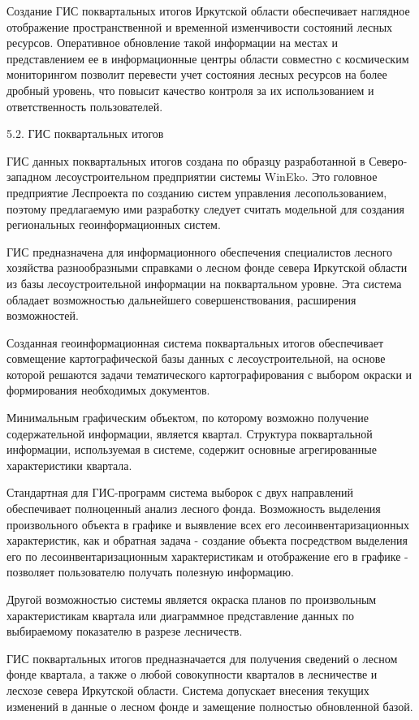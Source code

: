 \documentclass{report}
\begin{document}
Создание ГИС поквартальных итогов Иркутской области обеспечивает наглядное отображение пространственной и временной
изменчивости состояний лесных ресурсов. Оперативное обновление такой информации на местах и представлением ее в
информационные центры области совместно с космическим мониторингом позволит перевести учет состояния лесных ресурсов на
более дробный уровень, что повысит качество контроля за их использованием и ответственность пользователей.  

5.2. ГИС поквартальных итогов

ГИС данных поквартальных итогов создана по образцу разработанной в Северо-западном лесоустроительном предприятии системы
WinEko. Это головное предприятие Леспроекта по созданию систем управления лесопользованием, поэтому предлагаемую ими
разработку следует считать модельной для создания региональных геоинформационных систем. 

ГИС предназначена для информационного обеспечения специалистов лесного хозяйства разнообразными справками о лесном фонде
севера Иркутской области из базы лесоустроительной информации на поквартальном уровне. Эта система обладает
возможностью дальнейшего совершенствования, расширения возможностей. 

Созданная геоинформационная система поквартальных итогов обеспечивает совмещение картографической базы данных с
лесоустроительной, на основе которой решаются задачи тематического картографирования с выбором окраски и формирования
необходимых  документов. 

Минимальным графическим объектом, по которому возможно получение содержательной информации, является квартал. Структура
поквартальной информации, используемая в системе, содержит основные агрегированные характеристики квартала.

Стандартная для ГИС-программ система выборок с двух направлений обеспечивает полноценный анализ лесного фонда.
Возможность выделения произвольного объекта в графике и выявление всех его лесоинвентаризационных характеристик, как и
обратная задача - создание объекта посредством выделения его по лесоинвентаризационным характеристикам и отображение
его в графике - позволяет пользователю получать полезную информацию.

Другой возможностью системы является окраска планов по произвольным характеристикам квартала или диаграммное
представление данных по выбираемому показателю в разрезе лесничеств.

ГИС поквартальных итогов предназначается для получения сведений о лесном фонде квартала, а также о любой совокупности
кварталов в лесничестве и лесхозе севера Иркутской области. Система допускает внесения текущих изменений в данные о
лесном фонде и замещение полностью обновленной базой. 
\end{document}
